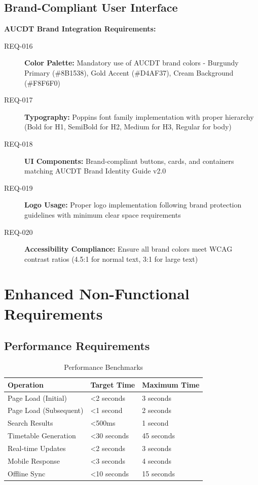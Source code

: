 \documentclass[11pt, a4paper]{article}
\begin{document}
\subsection{Brand-Compliant User Interface}
\label{sec:brand_ui}

\begin{brandbox}
\textbf{AUCDT Brand Integration Requirements:}
\begin{description}
    \item[REQ-016] \textbf{Color Palette:} Mandatory use of AUCDT brand colors - Burgundy Primary (\#8B1538), Gold Accent (\#D4AF37), Cream Background (\#F8F6F0)
    \item[REQ-017] \textbf{Typography:} Poppins font family implementation with proper hierarchy (Bold for H1, SemiBold for H2, Medium for H3, Regular for body)
    \item[REQ-018] \textbf{UI Components:} Brand-compliant buttons, cards, and containers matching AUCDT Brand Identity Guide v2.0
    \item[REQ-019] \textbf{Logo Usage:} Proper logo implementation following brand protection guidelines with minimum clear space requirements
    \item[REQ-020] \textbf{Accessibility Compliance:} Ensure all brand colors meet WCAG contrast ratios (4.5:1 for normal text, 3:1 for large text)
\end{description}
\end{brandbox}

\section{Enhanced Non-Functional Requirements}
\label{sec:enhanced_nonfunctional}

\subsection{Performance Requirements}
\label{sec:enhanced_performance}

\begin{table}[h]
\centering
\caption{Performance Benchmarks}
\begin{tabular}{@{}lll@{}}
\toprule
\textbf{Operation} & \textbf{Target Time} & \textbf{Maximum Time} \\
\midrule
Page Load (Initial) & <2 seconds & 3 seconds \\
Page Load (Subsequent) & <1 second & 2 seconds \\
Search Results & <500ms & 1 second \\
Timetable Generation & <30 seconds & 45 seconds \\
Real-time Updates & <2 seconds & 3 seconds \\
Mobile Response & <3 seconds & 4 seconds \\
Offline Sync & <10 seconds & 15 seconds \\
\bottomrule
\end{tabular}
\end{table}
\end{document}
